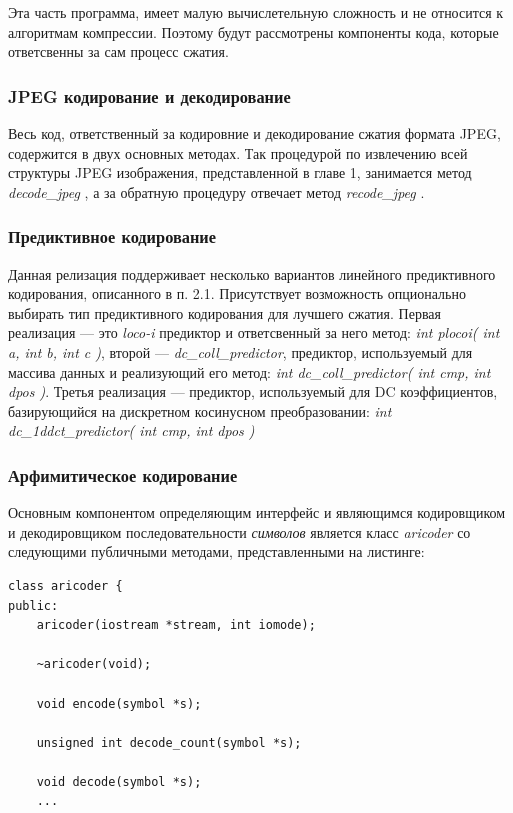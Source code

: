 \documentclass{matmex-diploma-custom}
\begin{document}
  Эта часть программа, имеет малую вычислетельную сложность и не относится к алгоритмам компрессии. Поэтому будут рассмотрены компоненты кода, которые ответсвенны за сам процесс сжатия.

\subsubsection{JPEG кодирование и декодирование}
Весь код, ответственный за кодировние  и декодирование сжатия формата JPEG, содержится в двух основных методах. Так процедурой по извлечению всей структуры JPEG изображения, представленной в главе 1, занимается метод \emph{ decode\_jpeg }, а за обратную процедуру отвечает метод \emph{ recode\_jpeg }.

\subsubsection{Предиктивное кодирование}
Данная релизация поддерживает несколько вариантов линейного предиктивного кодирования, описанного в п. 2.1. Присутствует возможность опционально выбирать тип предиктивного кодирования для лучшего сжатия.
    Первая реализация --- это \emph{loco-i} предиктор и ответсвенный за него метод: \emph{int plocoi( int a, int b, int c )}, второй --- \emph{dc\_coll\_predictor}, предиктор, используемый для массива данных и реализующий его метод: \emph{int dc\_coll\_predictor( int cmp, int dpos )}. Третья реализация --- предиктор, используемый для DC коэффициентов, базирующийся на дискретном косинусном преобразовании: \emph{int dc\_1ddct\_predictor( int cmp, int dpos )}
\subsubsection{Арфимитическое кодирование}
Основным компонентом определяющим интерфейс и являющимся кодировщиком и декодировщиком последовательности \emph{символов} является класс \emph{aricoder} со следующими публичными методами, представленными на листинге:


\begin{lstlisting}
class aricoder {
public:
    aricoder(iostream *stream, int iomode);

    ~aricoder(void);

    void encode(symbol *s);

    unsigned int decode_count(symbol *s);

    void decode(symbol *s);
    ...
\end{lstlisting}
\end{document}
